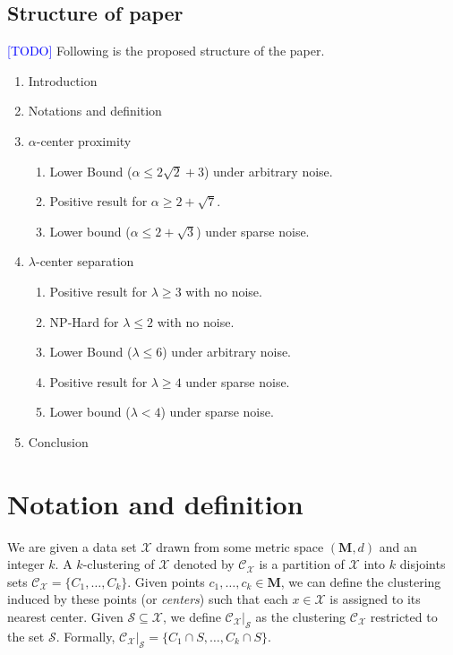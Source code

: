 \documentclass[anon,12pt]{colt2016} %
\newcommand{\mc}{\mathcal}
\newcommand{\mb}{\mathbf}
\newcommand{\todo}{\textcolor{blue}{[TODO]}\xspace}
\begin{document}
\subsection{Structure of paper}
\todo Following is the proposed structure of the paper.
\vspace{-0.1in}\begin{enumerate}
\setlength\itemsep{0em}
\item Introduction
\item Notations and definition
\item $\alpha$-center proximity	\vspace{-0.1in}
	\begin{enumerate}[leftmargin=32pt]
	\renewcommand{\labelenumii}{\theenumii}
	\renewcommand{\theenumii}{\theenumi.\arabic{enumii}.}
	\setlength\itemsep{0em}
	\item Lower Bound ($\alpha \le 2\sqrt{2} + 3$) under arbitrary noise.
	\item Positive result for $\alpha \ge 2+\sqrt{7}$.
	\item Lower bound ($\alpha \le 2+\sqrt{3}$) under sparse noise.
	\end{enumerate}
\item $\lambda$-center separation \vspace{-0.1in}
	\begin{enumerate}[leftmargin=32pt]
	\renewcommand{\labelenumii}{\theenumii}
	\renewcommand{\theenumii}{\theenumi.\arabic{enumii}.}
	\setlength\itemsep{0em}
	\item Positive result for $\lambda \ge 3$ with no noise.
	\item NP-Hard for $\lambda \le 2$ with no noise.
	\item Lower Bound ($\lambda \le 6$) under arbitrary noise.
	\item Positive result for $\lambda \ge 4$ under sparse noise.
	\item Lower bound ($\lambda < 4$) under sparse noise.
	\end{enumerate}
\item Conclusion
\end{enumerate}


\section{Notation and definition}
We are given a data set $\mc X$ drawn from some metric space $(\mb M, d)$ and an integer $k$. A $k$-clustering of $\mc X$ denoted by $\mc C_{\mc X}$ is a partition of $\mc X$ into $k$ disjoints sets $\mc C_{\mc X} = \{C_1, \ldots, C_k\}$. Given points $c_1, \ldots, c_k \in \mb M$, we can define the clustering induced by these points (or {\it centers}) such that each $x \in \mc X$ is assigned to its nearest center. Given $\mc S \subseteq \mc X$, we define $\mc C_{\mc X}|_{\mc S}$ as the clustering $\mc C_{\mc X}$ restricted to the set $\mc S$. Formally, $\mc C_{\mc X}|_{\mc S} = \{C_1 \cap S, \ldots, C_k \cap S\}$.
\end{document}

